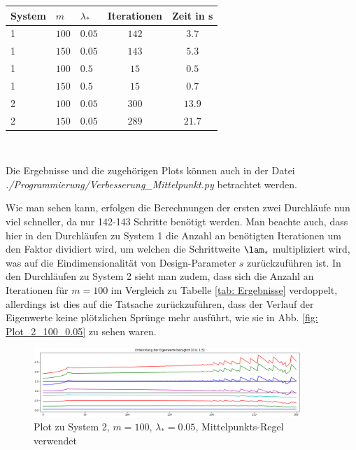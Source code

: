 \documentclass[a4paper,12pt]{report}
\newcommand{\1}{\mathds{1}}
\theoremstyle{plain} %
\theoremstyle{definition} %
\theoremstyle{remark}
\begin{document}
            \begin{table}[!ht]
                  \centering
                  \begin{tabular}{lllcc}
                       System & $m$ & $\lambda_*$ & Iterationen & Zeit in s\\
                       \hline
                       1 & $100$ & $0.05$ & $142$ & $3.7$ \\ 
                       1 & $150$ & $0.05$ & $143$ & $5.3$ \\
                       \hline
                       1 & $100$ & $0.5$ & $15$ & $0.5$ \\
                       1 & $150$ & $0.5$ & $15$ & $0.7$ \\
                       \hline
                       2 & $100$ & $0.05$ & $300$ & $13.9$ \\
                       2 & $150$ & $0.05$ & $289$ & $21.7$ \\
                       \hline
                  \end{tabular}\\
                  \label{tab: Ergebnisse_Mittelpunkt}
            \end{table}

            Die Ergebnisse und die zugehörigen Plots können auch in der Datei \textit{./Programmierung/Verbesserung\_Mittelpunkt.py} betrachtet werden.

            Wie man sehen kann, erfolgen die Berechnungen der ersten zwei Durchläufe nun viel schneller, da nur 142-143 Schritte benötigt werden.
            Man beachte auch, dass hier in den Durchläufen zu System 1 die Anzahl an benötigten Iterationen um den Faktor dividiert wird, um welchen die Schrittweite $\lam_*$ multipliziert wird, was auf die Eindimensionalität von Design-Parameter $s$ zurückzuführen ist.
            In den Durchläufen zu System 2 sieht man zudem, dass sich die Anzahl an Iterationen für $m=100$ im Vergleich zu Tabelle \ref{tab: Ergebnisse} verdoppelt, allerdings ist dies auf die Tatsache zurückzuführen, dass der Verlauf der Eigenwerte keine plötzlichen Sprünge mehr ausführt, wie sie in Abb. \ref{fig: Plot_2_100_0.05} zu sehen waren.

            \begin{figure}[h!t]
                  \centering
                  \includegraphics[width=0.9\textwidth, keepaspectratio]{./Mittelpunkt/Plot_2_100_0.05.png}
                  \caption[Plot zu System 2, $m=100$, $\lambda_*=0.05$, Mittelpunkts-Regel]{Plot zu System 2, $m=100$, $\lambda_*=0.05$, Mittelpunkts-Regel verwendet}
                  \label{fig: Plot_2_Mittelpunkt}
            \end{figure}
\end{document}

